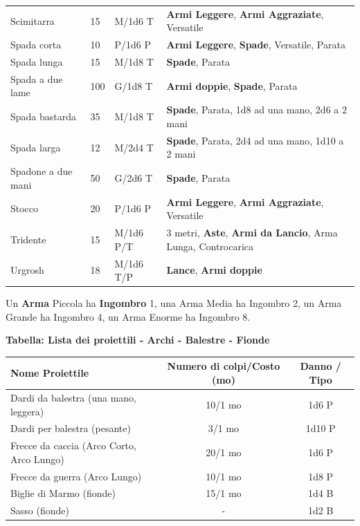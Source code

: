 \begin{xltabular}{\linewidth}{lllX}
Scimitarra& 15 & M/1d6 T&\textbf{Armi Leggere}, \textbf{Armi Aggraziate}, Versatile\\
Spada corta& 10 & P/1d6 P&\textbf{Armi Leggere}, \textbf{Spade}, Versatile, Parata\\
Spada lunga& 15 & M/1d8 T&\textbf{Spade}, Parata\\
Spada a due lame& 100& G/1d8 T& \textbf{Armi doppie}, \textbf{Spade}, Parata\\
Spada bastarda& 35 & M/1d8 T&\textbf{Spade}, Parata, 1d8 ad una mano, 2d6 a 2 mani\\
Spada larga& 12 & M/2d4 T&\textbf{Spade}, Parata, 2d4 ad una mano, 1d10 a 2 mani\\
Spadone a due mani& 50 & G/2d6 T&\textbf{Spade}, Parata\\
Stocco& 20 & P/1d6 P& \textbf{Armi Leggere}, \textbf{Armi Aggraziate}, Versatile\\
Tridente& 15 & M/1d6 P/T& 3 metri, \textbf{Aste}, \textbf{Armi da Lancio}, Arma Lunga, Controcarica\\
Urgrosh& 18 & M/1d6 T/P& \textbf{Lance}, \textbf{Armi doppie}\\
\end{xltabular}

\medskip

Un \textbf{Arma} Piccola ha \textbf{Ingombro} 1, una Arma Media ha Ingombro 2, un Arma Grande ha Ingombro 4, un Arma Enorme ha Ingombro 8.

\medskip

\textbf{Tabella: Lista dei proiettili - Archi - Balestre - Fionde}\label{proiettili}

\noindent\begin{tabular}{lcc}
	\toprule
\rowcolor{gray!20}\textbf{Nome Proiettile}& \textbf{Numero di colpi/Costo (mo)} & \textbf{Danno / Tipo}\\
\toprule
Dardi da balestra (una mano, leggera) & 10/1 mo & 1d6 P\\
\rowcolor{gray!20}Dardi per balestra (pesante) & 3/1 mo & 1d10 P\\
Frecce da caccia (Arco Corto, Arco Lungo)& 20/1 mo & 1d6 P\\
\rowcolor{gray!20}Frecce da guerra (Arco Lungo)& 10/1 mo & 1d8 P\\
Biglie di Marmo (fionde)& 15/1 mo & 1d4 B\\
\rowcolor{gray!20}Sasso (fionde)& -& 1d2 B
\end{tabular}

